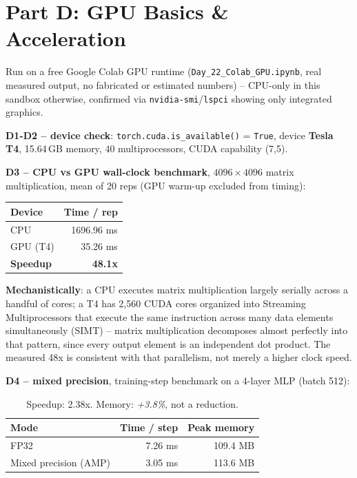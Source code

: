 \documentclass[11pt,a4paper]{article}
\begin{document}
\section*{Part D: GPU Basics \& Acceleration}

Run on a free Google Colab GPU runtime (\texttt{Day\_22\_Colab\_GPU.ipynb}, real measured
output, no fabricated or estimated numbers) -- CPU-only in this sandbox otherwise, confirmed
via \texttt{nvidia-smi}/\texttt{lspci} showing only integrated graphics.

\textbf{D1-D2 -- device check}: \texttt{torch.cuda.is\_available()} = \texttt{True}, device
\textbf{Tesla T4}, 15.64\,GB memory, 40 multiprocessors, CUDA capability (7,5).

\textbf{D3 -- CPU vs GPU wall-clock benchmark}, $4096\times4096$ matrix multiplication, mean of
20 reps (GPU warm-up excluded from timing):

\begin{table}[H]
\centering
\begin{tabular}{lr}
\toprule
\textbf{Device} & \textbf{Time / rep} \\
\midrule
CPU & 1696.96 ms \\
GPU (T4) & 35.26 ms \\
\midrule
\textbf{Speedup} & \textbf{48.1x} \\
\bottomrule
\end{tabular}
\end{table}

\textbf{Mechanistically}: a CPU executes matrix multiplication largely serially across a
handful of cores; a T4 has 2{,}560 CUDA cores organized into Streaming Multiprocessors that
execute the same instruction across many data elements simultaneously (SIMT) -- matrix
multiplication decomposes almost perfectly into that pattern, since every output element is an
independent dot product. The measured 48x is consistent with that parallelism, not merely a
higher clock speed.

\textbf{D4 -- mixed precision}, training-step benchmark on a 4-layer MLP (batch 512):

\begin{table}[H]
\centering
\begin{tabular}{lrr}
\toprule
\textbf{Mode} & \textbf{Time / step} & \textbf{Peak memory} \\
\midrule
FP32 & 7.26 ms & 109.4 MB \\
Mixed precision (AMP) & 3.05 ms & 113.6 MB \\
\bottomrule
\end{tabular}
\caption{Speedup: 2.38x. Memory: \emph{+3.8\%}, not a reduction.}
\end{table}
\end{document}
